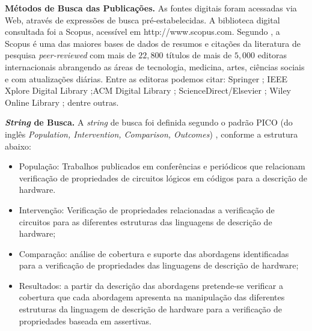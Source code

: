 \textbf{Métodos de Busca das Publicações.} As fontes digitais foram acessadas via Web, através de expressões de busca pré-estabelecidas. A biblioteca digital consultada foi a Scopus, acessível em http://www.scopus.com. Segundo , a Scopus é uma das maiores bases de dados de resumos e citações da literatura de pesquisa \textit{peer-reviewed} com mais de $22,800$ títulos de mais de $5,000$ editoras internacionais abrangendo as áreas de tecnologia, medicina, artes, ciências sociais e com atualizações diárias. Entre as editoras podemos citar: Springer \cite{Springer}; IEEE Xplore Digital Library \cite{IEEE};ACM Digital Library \cite{ACM} ; ScienceDirect/Elsevier \cite{B.V}; Wiley Online Library \cite{Sons}; dentre outras.

\textbf{\textit{String} de Busca.} A \textit{string} de busca foi definida segundo o padrão PICO (do inglês \textit{Population, Intervention, Comparison, Outcomes}) \cite{kitchenham2009systematic}, conforme a estrutura abaixo:
\begin{itemize}
	\item População: Trabalhos publicados em conferências e periódicos que relacionam verificação de propriedades de circuitos lógicos em códigos para a descrição de hardware.

	\item Intervenção: Verificação de propriedades relacionadas a verificação de circuitos para as diferentes estruturas das linguagens de descrição de hardware;

	\item Comparação: análise de cobertura e suporte das abordagens identificadas para a verificação de propriedades das linguagens de descrição de hardware;

	\item Resultados: a partir da descrição das abordagens pretende-se verificar a cobertura que cada abordagem apresenta na manipulação das diferentes estruturas da linguagem de descrição de hardware para a verificação de propriedades baseada em assertivas.
\end{itemize}

